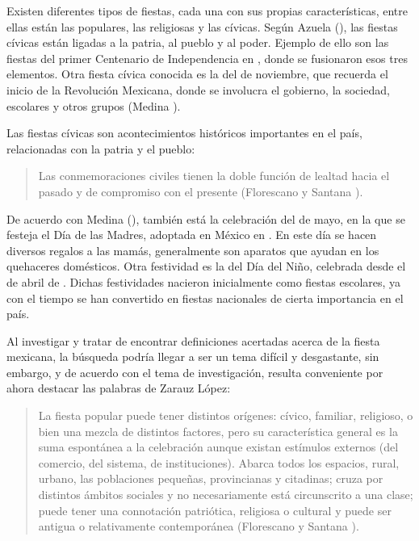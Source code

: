 \documentclass[14pt,letterpaper,twoside]{extbook} %
\begin{document}
Existen diferentes tipos de fiestas, cada una con sus propias características, entre ellas están las populares, las religiosas y las cívicas. Según Azuela (), las fiestas cívicas están ligadas a la patria, al pueblo y al poder. Ejemplo de ello son las fiestas del primer Centenario de Independencia en , donde se fusionaron esos tres elementos. Otra fiesta cívica conocida es la del  de noviembre, que recuerda el inicio de la Revolución Mexicana, donde se involucra el gobierno, la sociedad, escolares y otros grupos (Medina ).

Las fiestas cívicas son acontecimientos históricos importantes en el país, relacionadas con la patria y el pueblo:

\begin{quotation}
\noindent Las conmemoraciones civiles tienen la doble función de lealtad hacia el pasado y de compromiso con el presente (Florescano y Santana ).
\end{quotation}

\noindent De acuerdo con Medina (), también está la celebración del  de mayo, en la que se festeja el Día de las Madres, adoptada en México en . En este día se hacen diversos regalos a las mamás, generalmente son aparatos que ayudan en los quehaceres domésticos. Otra festividad es la del Día del Niño, celebrada desde el  de abril de . Dichas festividades nacieron inicialmente como fiestas escolares, ya con el tiempo se han convertido en fiestas nacionales de cierta importancia en el país.

Al investigar y tratar de encontrar definiciones acertadas acerca de la fiesta mexicana, la búsqueda podría llegar a ser un tema difícil y desgastante, sin embargo, y de acuerdo con el tema de investigación, resulta conveniente por ahora destacar las palabras de Zarauz López:

\begin{quotation}
\noindent La fiesta popular puede tener distintos orígenes: cívico, familiar, religioso, o bien una mezcla de distintos factores, pero su característica general es la suma espontánea a la celebración aunque existan estímulos externos (del comercio, del sistema, de instituciones). Abarca todos los espacios, rural, urbano, las poblaciones pequeñas, provincianas y citadinas; cruza por distintos ámbitos sociales y no necesariamente está circunscrito a una clase; puede tener una connotación patriótica, religiosa o cultural y puede ser antigua o relativamente contemporánea (Florescano y Santana ).
\end{quotation}
\end{document}
